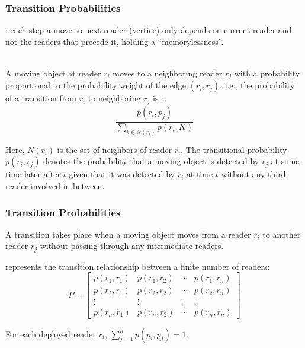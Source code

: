 \begin{frame}
\frametitle{Transition Probabilities}

: each step a move to next reader (vertice) only depends on current reader and not the readers that precede it, holding a ``memorylessness''.\\~\\ \pause

A moving object at reader $r_i$ moves to a neighboring reader $r_j$ with a probability proportional to the probability weight of the edge $(r_i, r_j)$, i.e., the probability of a transition from $r_i$ to neighboring $r_j$ is : \pause
\begin{equation}
  \frac{p(r_i, p_j)}{\sum_{k \in N(r_i)}p(r_i, K)}
\end{equation}

\pause
Here, $N(r_i)$ is the set of neighbors of reader $r_i$. The transitional probability $p(r_i, r_j)$ denotes the probability that a moving object is detected by $r_j$ at some time later after $t$ given that it was detected by $r_i$ at time $t$ without any third reader involved in-between.

\end{frame}


\begin{frame}
\frametitle{Transition Probabilities}

\begin{definition}[Transition]
  A transition takes place when a moving object moves from a reader $r_i$ to another reader $r_j$ without passing through any intermediate readers.
\end{definition}

\vspace{10pt}

 represents the transition relationship between a finite number of readers:
\begin{equation}
  P = \begin{bmatrix}
p(r_1, r_1) & p(r_1, r_2) & \cdots & p(r_1, r_n)\\
p(r_2, r_1) & p(r_2, r_2) & \cdots & p(r_2, r_n)\\
\vdots & \vdots & \vdots & \vdots\\
p(r_n, r_1) & p(r_n, r_2) & \cdots & p(r_n, r_n)
\end{bmatrix}
\end{equation}

\vspace{5pt}

For each deployed reader $r_i$, $\sum_{j=1}^{n}p(p_i,p_j) = 1$.

\end{frame}

